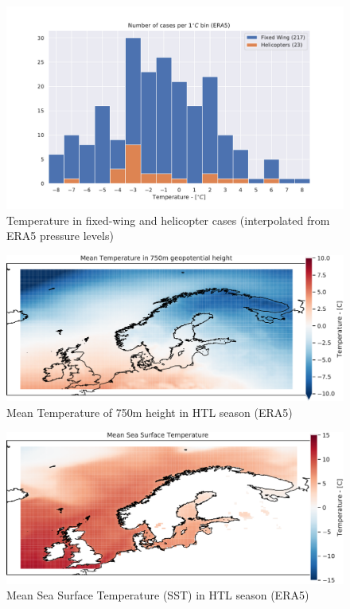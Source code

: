 \begin{figure}
    \centering
    \includegraphics[width=\textwidth]{Figures/temperature.pdf}
    \caption{Temperature in fixed-wing and helicopter cases (interpolated from ERA5 pressure levels)}
    \label{fig:temperatureera5}
\end{figure}

\begin{figure}
    \centering
    \includegraphics[width=\textwidth]{Figures/MeanT750era5.pdf}
    \caption{Mean Temperature of 750m height in HTL season (ERA5)}
    \label{fig:meaneraT750}
\end{figure}

\begin{figure}
    \centering
    \includegraphics[width=\textwidth]{Figures/MeanSSTera5.pdf}
    \caption{Mean Sea Surface Temperature (SST) in HTL season (ERA5)}
    \label{fig:meanerasst}
\end{figure}

